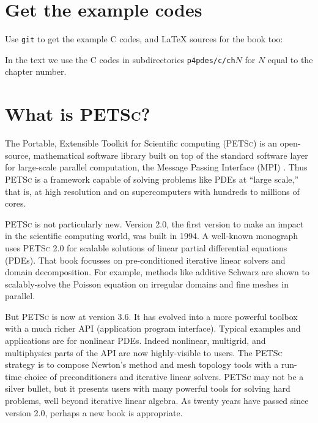 \documentclass{tufte-book}
\newcommand{\PETSCVERSION}{3.6\xspace}
\newcommand{\PETSCMINORVERSION}{3.6.0\xspace}
\newcommand{\PETSCMONTH}{June 2015\xspace}
\theoremstyle{definition}
\newcommand{\PETSc}{\textsc{PETSc}\xspace}
\begin{document}
\section{Get the example codes}

Use \texttt{git} to get the example C codes, and \LaTeX\xspace sources for the book too:
In the text we use the C codes in subdirectories \texttt{p4pdes/c/ch}$N$ for $N$ equal to the chapter number.

\section{What is \PETSc?}

The Portable, Extensible Toolkit for Scientific computing (\PETSc) is an open-source, mathematical software library built on top of the standard software layer for large-scale parallel computation, the Message Passing Interface (MPI) \citep{Groppetal1999}.  Thus \PETSc is a framework capable of solving problems like PDEs at ``large scale,'' that is, at high resolution and on supercomputers with hundreds to millions of cores.

\PETSc is not particularly new.  Version 2.0, the first version to make an impact in the scientific computing world, was built in 1994.  A well-known monograph \citet{Smithetal1996} uses \PETSc 2.0 for scalable solutions of linear partial differential equations (PDEs).  That book focusses on pre-conditioned iterative linear solvers and domain decomposition.  For example, methods like additive Schwarz are shown to scalably-solve the Poisson equation on irregular domains and fine meshes in parallel.

But \PETSc is now at version \PETSCVERSION.\sidenote{Version \PETSCMINORVERSION is current in \PETSCMONTH.}  It has evolved into a more powerful toolbox with a much richer API (application program interface).  Typical examples and applications are for nonlinear PDEs.  Indeed nonlinear, multigrid, and multiphysics parts of the API are now highly-visible to users.  The \PETSc strategy is to compose Newton's method and mesh topology tools with a run-time choice of preconditioners and iterative linear solvers.  \PETSc may not be a silver bullet, but it presents users with many powerful tools for solving hard problems, well beyond iterative linear algebra.  As twenty years have passed since version 2.0, perhaps a new book is appropriate.
\end{document}

